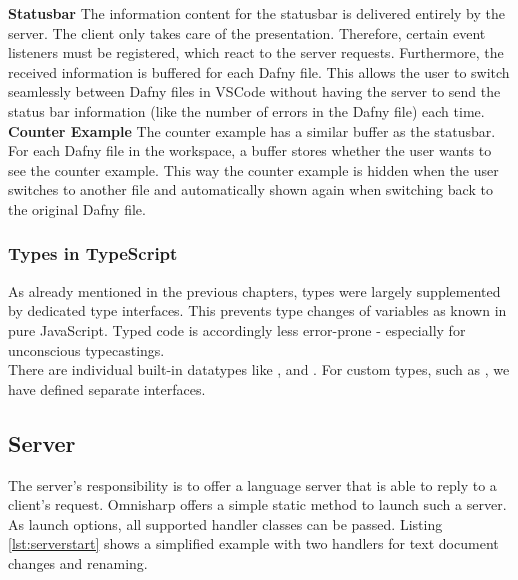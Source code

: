 {\bf Statusbar} \textendash{}
The information content for the statusbar is delivered entirely by the server.
The client only takes care of the presentation.
Therefore, certain event listeners must be registered, which react to the server requests.
Furthermore, the received information is buffered for each Dafny file.
This allows the user to switch seamlessly between Dafny files in VSCode
without having the server to send the status bar information
(like the number of errors in the Dafny file) each time.  \\

{\bf Counter Example} \textendash{}
The counter example has a similar buffer as the statusbar.
For each Dafny file in the workspace, a buffer stores whether the user wants to see the counter example.
This way the counter example is hidden when the user switches to another file
and automatically shown again when switching back to the original Dafny file.

\subsubsection{Types in TypeScript}
As already mentioned in the previous chapters,  types were largely supplemented by dedicated type interfaces. This prevents type changes of variables as known in pure JavaScript. Typed code is accordingly less error-prone - especially for unconscious typecastings. \\

There are individual built-in datatypes like ,  and  \cite{ts-types}.
For custom types, such as , we have defined separate interfaces.



\subsection{Server}
The server's responsibility is to offer a language server that is able to reply to a client's request. Omnisharp offers a simple static method to launch such a server. As launch options, all supported handler classes can be passed. Listing \ref{lst:serverstart} shows a simplified example with two handlers for text document changes and renaming.

